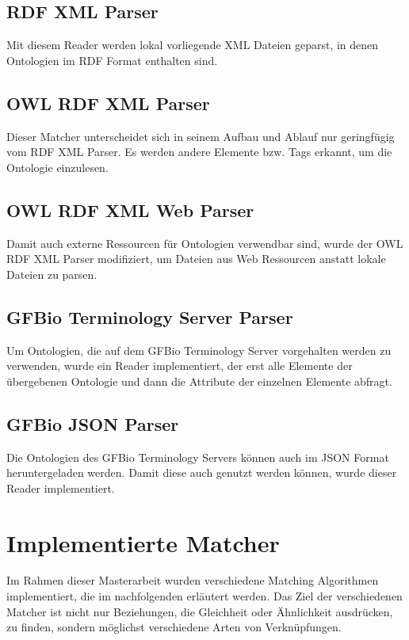 		\subsection{RDF XML Parser}
		Mit diesem Reader werden lokal vorliegende XML Dateien geparst, in denen
		Ontologien im RDF Format enthalten sind.
		
		\subsection{OWL RDF XML Parser}
		Dieser Matcher unterscheidet sich in seinem Aufbau und Ablauf nur geringfügig
		vom RDF XML Parser. Es werden andere Elemente bzw. Tags erkannt, um die
		Ontologie einzulesen.
		
		\subsection{OWL RDF XML Web Parser}
		Damit auch externe Ressourcen für Ontologien verwendbar sind, wurde der OWL
		RDF XML Parser modifiziert, um Dateien aus Web Ressourcen anstatt lokale
		Dateien zu parsen.
		
		\subsection{GFBio Terminology Server Parser}
		Um Ontologien, die auf dem GFBio Terminology Server vorgehalten werden zu
		verwenden, wurde ein Reader implementiert, der erst alle Elemente der
		übergebenen Ontologie und dann die Attribute der einzelnen Elemente abfragt.
		
		\subsection{GFBio JSON Parser}
		Die Ontologien des GFBio Terminology Servers können auch im JSON Format
		heruntergeladen werden. Damit diese auch genutzt werden können, wurde
		dieser Reader implementiert. 
		
		\section{Implementierte Matcher}
		\label{ImplementierteMatcher}
		Im Rahmen dieser Masterarbeit wurden verschiedene Matching Algorithmen
		implementiert, die im nachfolgenden erläutert werden. Das Ziel der
		verschiedenen Matcher ist nicht nur Beziehungen, die Gleichheit oder
		Ähnlichkeit ausdrücken, zu finden, sondern möglichst verschiedene Arten von Verknüpfungen.
		
